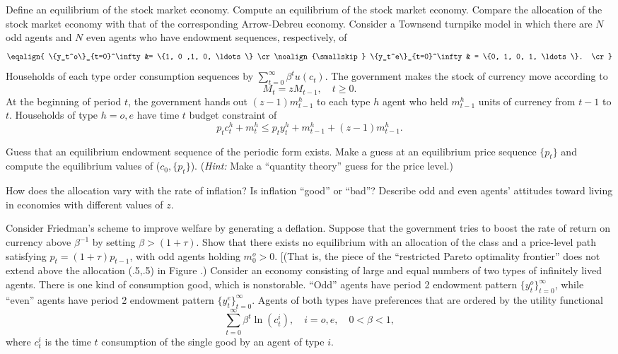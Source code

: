 \medskip
{}  Define an equilibrium of the stock market
economy.
\medskip{}  Compute an equilibrium of the stock market
economy.
\medskip
{}  Compare the allocation of the stock
market economy with that of the corresponding Arrow-Debreu
economy.
\medskip
{} 
\medskip\noindent
   Consider a Townsend turnpike model  in which there are
$N$ odd agents and $N$ even agents who have endowment
sequences, respectively, of
$$\eqalign{ \{y_t^o\}_{t=0}^\infty &= \{1, 0 ,1, 0, \ldots \} \cr
\noalign{\smallskip}
           \{y_t^e\}_{t=0}^\infty & = \{0, 1, 0, 1, \ldots \}. \cr}$$
Households of each type order consumption sequences
by $\sum_{t=0}^\infty \beta^t u(c_t)$.
  The government
makes the stock of currency move according to
$$ M_t = z M_{t-1},  \quad t \geq 0 .$$
At the beginning of period $t$,
the government hands out $(z-1) m_{t-1}^h$ to each
type $h$ agent who held $m_{t-1}^h$ units of currency from
$t-1$ to $t$.  Households of type $h=o,e$ have time $t$ budget constraint of
$$ p_t c^h_t + m_t^h \leq p_t y_t^h + m_{t-1}^h + (z-1) m_{t-1}^h .$$
\medskip

Guess that an equilibrium endowment sequence of the periodic
form  exists.  Make a guess at an equilibrium price sequence
$\{p_t\}$ and compute the equilibrium values of
($c_0, \{p_t\}$).  ({\it Hint:} Make a ``quantity theory''
guess for the price level.)

\medskip
{}  How does the allocation vary with
the rate of inflation?  Is inflation ``good'' or ``bad''? Describe
odd and even agents' attitudes toward living in economies
with different values of $z$.

\medskip

\medskip\noindent
  Consider Friedman's scheme to improve
welfare by  generating
a deflation.   Suppose that the
government tries to boost the rate
of return on currency above $\beta^{-1}$ by
setting $\beta > (1+\tau)$.  Show that there exists no equilibrium
with an allocation of the class  and  a price-level
path satisfying $p_t = (1+\tau) p_{t-1}$, with odd agents
holding $m_0^o>0$.  [(That is, the piece of the ``restricted
Pareto optimality frontier'' does not extend above
the allocation (.5,.5) in Figure .)%
\medskip
{}
\medskip\noindent
  Consider an economy consisting of large and equal
numbers of two types of infinitely lived agents. There
is one kind of consumption good, which is nonstorable.
``Odd'' agents have period 2 endowment pattern $\{y_t^o\}_{t=0}^\infty$,
while ``even'' agents have period 2 endowment pattern
$\{y_t^e\}_{t=0}^\infty$.
 Agents of both types have preferences that are ordered
by the utility functional
$$ \sum_{t=0}^\infty \beta^t \ln (c_t^i) , \quad i = o,e , \quad 0 <
  \beta < 1  ,  $$
where $c_t^i$ is the time $t$ consumption of the single good
by an agent of type $i$.

